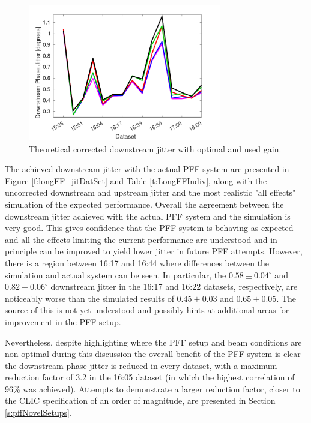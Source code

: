 \begin{figure}
  \centering
  \includegraphics[width=0.75\textwidth]{Figures/feedforward/longFF_datSetJitSim}
  \caption{Theoretical corrected downstream jitter with optimal and used gain.}
  \label{f:longFF_datSetJitSim}
\end{figure}

The achieved downstream jitter with the actual PFF system are presented in Figure 
\ref{f:longFF_jitDatSet} and Table \ref{t:LongFFIndiv}, along with the uncorrected 
downstream and upstream jitter and the most realistic "all effects" simulation of the 
expected performance. Overall the agreement between the downstream jitter achieved with 
the actual PFF system and the simulation is very good. This gives confidence that the 
PFF system is behaving as expected and all the effects limiting the current performance 
are understood and in principle can be improved to yield lower jitter in future PFF 
attempts. However, there is a region between 16:17 and 16:44 where differences between 
the simulation and actual system can be seen. In particular, the \(0.58\pm0.04^\circ\) 
and \(0.82\pm0.06^\circ\) downstream jitter in the 16:17 and 16:22 datasets, 
respectively, are noticeably worse than the simulated results of \(0.45\pm0.03\) and 
\(0.65\pm0.05\). The source of this is not yet understood and possibly hints at 
additional areas for improvement in the PFF setup. 


Nevertheless, despite highlighting where the PFF setup and beam conditions are 
non-optimal during this discussion the overall benefit of the PFF system is clear - the 
downstream phase jitter is reduced in every dataset, with a maximum reduction factor of 
3.2 in the 16:05 dataset (in which the highest correlation of 96\% was achieved). 
Attempts to demonstrate a larger reduction factor, closer to the CLIC specification of 
an order of magnitude, are presented in Section \ref{s:pffNovelSetups}. 



